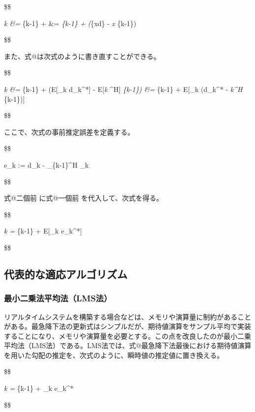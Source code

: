 \$\$

\emph{k \&= }\{k-1\} + \Delta {} \&= \emph{\{k-1\}
+ \mu (}\{xd\} - \emph{x }\{k-1\})

\$\$

また、式@は次式のように書き直すことができる。

\$\$

\emph{k \&= }\{k-1\} + \mu (E{[}\_k d\_k\^{}*{]} -
E{[}\emph{k }\^{}H{]} \emph{\{k-1\}) \&=
}\{k-1\} + \mu E{[}\_k (d\_k\^{}* - \emph{k\^{}H
}\{k-1\}){]}

\$\$

ここで、次式の事前推定誤差を定義する。

\$\$

e\_k := d\_k - \_\{k-1\}\^{}H \_k

\$\$

式@二個前 に式@一個前 を代入して、次式を得る。

\$\$

\emph{k = }\{k-1\} + \mu E{[}\_k e\_k\^{}*{]}

\$\$

\hypertarget{ux4ee3ux8868ux7684ux306aux9069ux5fdcux30a2ux30ebux30b4ux30eaux30baux30e0}{%
\subsection{代表的な適応アルゴリズム}\label{ux4ee3ux8868ux7684ux306aux9069ux5fdcux30a2ux30ebux30b4ux30eaux30baux30e0}}

\hypertarget{ux6700ux5c0fux4e8cux4e57ux6cd5ux5e73ux5747ux6cd5lmsux6cd5}{%
\subsubsection{最小二乗法平均法（LMS法）}\label{ux6700ux5c0fux4e8cux4e57ux6cd5ux5e73ux5747ux6cd5lmsux6cd5}}

リアルタイムシステムを構築する場合などは、メモリや演算量に制約があることがある。最急降下法の更新式はシンプルだが、期待値演算をサンプル平均で実装することになり、メモリや演算量を必要とする。この点を改良したのが最小二乗平均法（LMS法）である。LMS法では、式@最急降下法最後における期待値演算を用いた勾配の推定を、次式のように、瞬時値の推定値に置き換える。

\$\$

\emph{k = }\{k-1\} + \mu {}\_k e\_k\^{}*

\$\$

